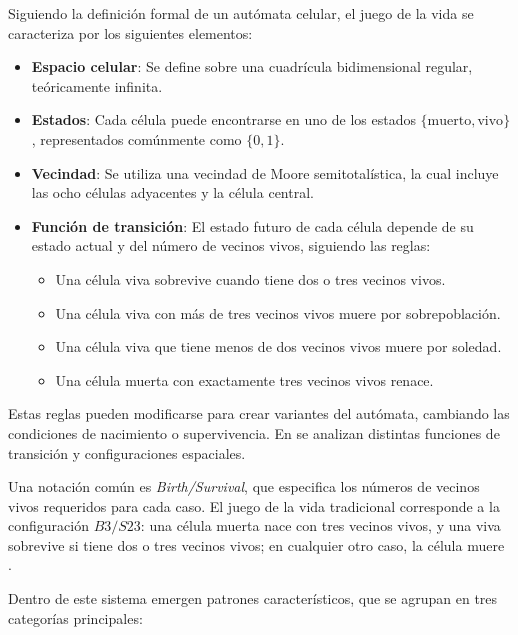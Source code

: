 Siguiendo la definición formal de un autómata celular, el juego de la vida se caracteriza por los siguientes elementos:

\begin{itemize}
	\item \textbf{Espacio celular}: Se define sobre una cuadrícula bidimensional regular, teóricamente infinita. 
	\item \textbf{Estados}: Cada célula puede encontrarse en uno de los estados $\{ \text{muerto}, \text{vivo} \}$, representados comúnmente como $\{0, 1\}$.
	
	\item \textbf{Vecindad}: Se utiliza una vecindad de Moore semitotalística, la cual incluye las ocho células adyacentes y la célula central.
	
	\item \textbf{Función de transición}: El estado futuro de cada célula depende de su estado actual y del número de vecinos vivos, siguiendo las reglas:
	
	\begin{itemize}
		\item Una célula viva sobrevive cuando tiene dos o tres vecinos vivos.  
		\item Una célula viva con más de tres vecinos vivos muere por sobrepoblación.  
		\item Una célula viva que tiene menos de dos vecinos vivos muere por soledad.  
		\item Una célula muerta con exactamente tres vecinos vivos renace.  
	\end{itemize}
	
\end{itemize}
Estas reglas pueden modificarse para crear variantes del autómata, cambiando las condiciones de nacimiento o supervivencia. En \cite{lifewiki_life} se analizan distintas funciones de transición y configuraciones espaciales.

Una notación común es \textit{Birth/Survival}, que especifica los números de vecinos vivos requeridos para cada caso. El juego de la vida tradicional corresponde a la configuración $B3/S23$: una célula muerta nace con tres vecinos vivos, y una viva sobrevive si tiene dos o tres vecinos vivos; en cualquier otro caso, la célula muere \cite{lifewiki_life}.

Dentro de este sistema emergen patrones característicos, que se agrupan en tres categorías principales:

